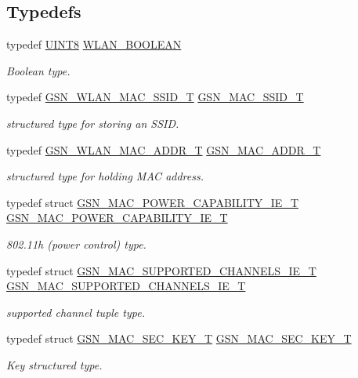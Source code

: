 \subsection*{Typedefs}
\begin{DoxyCompactItemize}
\item 
typedef \hyperlink{a00660_gab27e9918b538ce9d8ca692479b375b6a}{UINT8} \hyperlink{a00642_ga7fb691c78d3a1046fa998bae1560e1a5}{WLAN\_\-BOOLEAN}
\begin{DoxyCompactList}\small\item\em Boolean type. \end{DoxyCompactList}\item 
typedef \hyperlink{a00417}{GSN\_\-WLAN\_\-MAC\_\-SSID\_\-T} \hyperlink{a00642_gaa99e8c0b151cd3a4b954dda1b8d45170}{GSN\_\-MAC\_\-SSID\_\-T}
\begin{DoxyCompactList}\small\item\em structured type for storing an SSID. \end{DoxyCompactList}\item 
typedef \hyperlink{a00416}{GSN\_\-WLAN\_\-MAC\_\-ADDR\_\-T} \hyperlink{a00642_ga1150dbb5bc1f1413f5de4acf75c48815}{GSN\_\-MAC\_\-ADDR\_\-T}
\begin{DoxyCompactList}\small\item\em structured type for holding MAC address. \end{DoxyCompactList}\item 
typedef struct \hyperlink{a00122}{GSN\_\-MAC\_\-POWER\_\-CAPABILITY\_\-IE\_\-T} \hyperlink{a00642_ga7dca958f849da86237513f7adc55ed53}{GSN\_\-MAC\_\-POWER\_\-CAPABILITY\_\-IE\_\-T}
\begin{DoxyCompactList}\small\item\em 802.11h (power control) type. \end{DoxyCompactList}\item 
typedef struct \hyperlink{a00133}{GSN\_\-MAC\_\-SUPPORTED\_\-CHANNELS\_\-IE\_\-T} \hyperlink{a00642_ga0e3372dcd5ddb7b5c77b4d1d132cd8c4}{GSN\_\-MAC\_\-SUPPORTED\_\-CHANNELS\_\-IE\_\-T}
\begin{DoxyCompactList}\small\item\em supported channel tuple type. \end{DoxyCompactList}\item 
typedef struct \hyperlink{a00131}{GSN\_\-MAC\_\-SEC\_\-KEY\_\-T} \hyperlink{a00642_ga47d838a4f5db3c6d8039dac8b4726479}{GSN\_\-MAC\_\-SEC\_\-KEY\_\-T}
\begin{DoxyCompactList}\small\item\em Key structured type. \end{DoxyCompactList}\item 

\end{DoxyCompactItemize}
